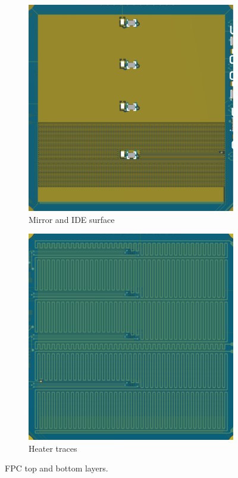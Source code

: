\begin{figure}
    \centering
    \begin{subfigure}{0.5\textwidth}
        \centering
        \includegraphics[width=.80\linewidth]{images/flex_mirror.pdf}
        \caption{Mirror and \Gls{IDE} surface} \label{i:mirror}
    \end{subfigure}%
    \begin{subfigure}{0.5\textwidth}
        \centering
        \includegraphics[width=.80\linewidth]{images/flex_heater.pdf}
        \caption{Heater traces} \label{i:heater}
    \end{subfigure}%
  
  \caption{\Gls{FPC} top and bottom layers.} \label{i:mirror_heater}
\end{figure}


